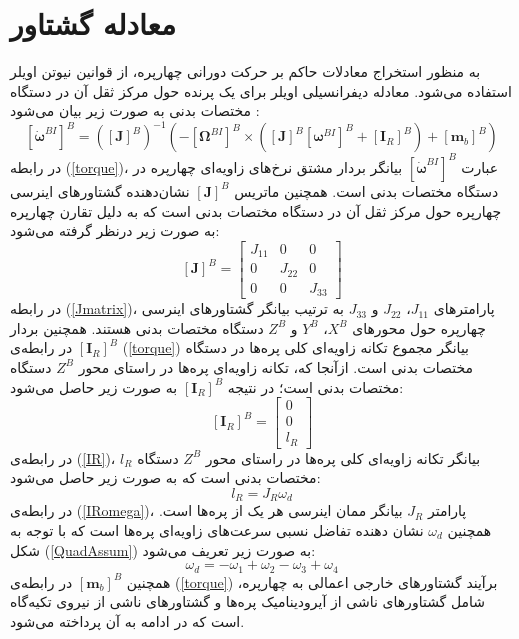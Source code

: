 \section{معادله گشتاور}
به منظور استخراج معادلات حاکم بر حرکت دورانی چهارپره، از قوانین نیوتن اویلر استفاده می‌شود. 
معادله دیفرانسیلی اویلر برای یک پرنده حول مرکز ثقل آن در دستگاه مختصات بدنی به صورت زیر بیان می‌شود \cite{zipfel2000modeling}:
\begin{equation}\label{torque}
	\left[\dot{\boldsymbol{\omega}}^{BI}\right]^B = \left(\left[\boldsymbol J\right]^B\right)^{-1}
	\left(-\left[\boldsymbol \Omega^{BI}\right]^B\times\left(
	\left[\boldsymbol J\right]^B\left[\boldsymbol \omega^{BI}\right]^B+
	\left[\boldsymbol I_R\right]^B
	\right)+ \left[\boldsymbol m_b\right]^B\right)
\end{equation}
در رابطه
(\ref{torque})، عبارت 
$\left[\dot{\boldsymbol\omega}^{BI}\right]^B$
بیانگر بردار مشتق نرخ‌های زاویه‌ای چهارپره در دستگاه مختصات بدنی است. همچنین ماتریس 
$\left[\boldsymbol J\right]^B$
نشان‌دهنده گشتاورهای اینرسی چهارپره حول مرکز ثقل آن در دستگاه مختصات بدنی است که به دلیل تقارن چهارپره به صورت زیر درنظر گرفته
 می‌شود:
 \begin{equation}\label{Jmatrix}
 	\left[\boldsymbol J\right]^B = \begin{bmatrix}
 		J_{11} & 0 &0\\
 		0 & J_{22} & 0\\
 		0 & 0 & J_{33}
 	\end{bmatrix}
 \end{equation}
در رابطه 
(\ref{Jmatrix})، پارامترهای 
$J_{11}$،
$J_{22}$
و 
$J_{33}$
به ترتیب بیانگر گشتاور‌های اینرسی چهارپره حول محورهای 
$X^B$،
$Y^B$
و 
$Z^B$
دستگاه مختصات بدنی هستند. همچنین بردار 
$\left[\boldsymbol I_R\right]^B$
در رابطه‌ی 
(\ref{torque})
بیانگر مجموع تكانه زاویه‌ای کلی پره‌ها در دستگاه مختصات بدنی است. ازآنجا که، تكانه زاویه‌ای پره‌ها در راستای محور
$Z^B$
دستگاه مختصات بدنی است؛ در نتیجه 
$\left[\boldsymbol I_R\right]^B$
به صورت زیر حاصل می‌شود:
\begin{equation}\label{IR}
	\left[\boldsymbol I_R\right]^B = 
	\begin{bmatrix}
		0\\0\\l_R
	\end{bmatrix}
\end{equation}
در رابطه‌ی 
(\ref{IR})، 
$l_R$
بیانگر تكانه زاویه‌ای کلی پره‌ها در راستای محور
$Z^B$
دستگاه مختصات بدنی است که به صورت زیر حاصل می‌شود:
\begin{equation}\label{IRomega}
	l_R = J_R\omega_d
\end{equation}
در رابطه‌ی
(\ref{IRomega})، پارامتر
$J_R$
بیانگر ممان اینرسی هر یک از پره‌ها است. همچنین
$\omega_d$
نشان دهنده تفاضل نسبی سرعت‌های زاویه‌ای پره‌ها است که با توجه به شكل
(\ref{QuadAssum})
به صورت زیر تعریف می‌شود:
\begin{equation}\label{omega_d}
	\omega_d = -\omega_1 + \omega_2-\omega_3 + \omega_4
\end{equation}
همچنین 
$\left[\boldsymbol m_b\right]^B$
در رابطه‌ی
(\ref{torque})
برآیند گشتاورهای خارجی اعمالی به چهارپره، شامل 
گشتاورهای ناشی از آیرودینامیک پره‌ها و گشتاورهای ناشی از نیروی تكیه‌گاه است که در ادامه به آن پرداخته می‌شود.



